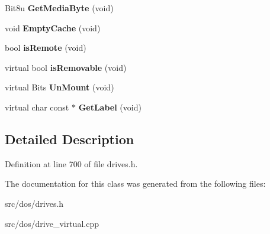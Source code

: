 \begin{DoxyCompactItemize}
\item 
\hypertarget{classVirtual__Drive_a204a007b01b36835353da1cfe602f347}{Bit8u {\bfseries Get\-Media\-Byte} (void)}\label{classVirtual__Drive_a204a007b01b36835353da1cfe602f347}

\item 
\hypertarget{classVirtual__Drive_a07c23b86ce90e36cf6bfe57e700ef24f}{void {\bfseries Empty\-Cache} (void)}\label{classVirtual__Drive_a07c23b86ce90e36cf6bfe57e700ef24f}

\item 
\hypertarget{classVirtual__Drive_adaf2f6f0157674dc2dc1a27f190d6413}{bool {\bfseries is\-Remote} (void)}\label{classVirtual__Drive_adaf2f6f0157674dc2dc1a27f190d6413}

\item 
\hypertarget{classVirtual__Drive_a0be0807a2cc522a60baed239a2c420fb}{virtual bool {\bfseries is\-Removable} (void)}\label{classVirtual__Drive_a0be0807a2cc522a60baed239a2c420fb}

\item 
\hypertarget{classVirtual__Drive_acc65a1146b71de3da99281217bacbb65}{virtual Bits {\bfseries Un\-Mount} (void)}\label{classVirtual__Drive_acc65a1146b71de3da99281217bacbb65}

\item 
\hypertarget{classVirtual__Drive_af75083c9925f93c99fab3c424d10f212}{virtual char const $\ast$ {\bfseries Get\-Label} (void)}\label{classVirtual__Drive_af75083c9925f93c99fab3c424d10f212}

\end{DoxyCompactItemize}


\subsection{Detailed Description}


Definition at line 700 of file drives.\-h.



The documentation for this class was generated from the following files\-:\begin{DoxyCompactItemize}
\item 
src/dos/drives.\-h\item 
src/dos/drive\-\_\-virtual.\-cpp\end{DoxyCompactItemize}
